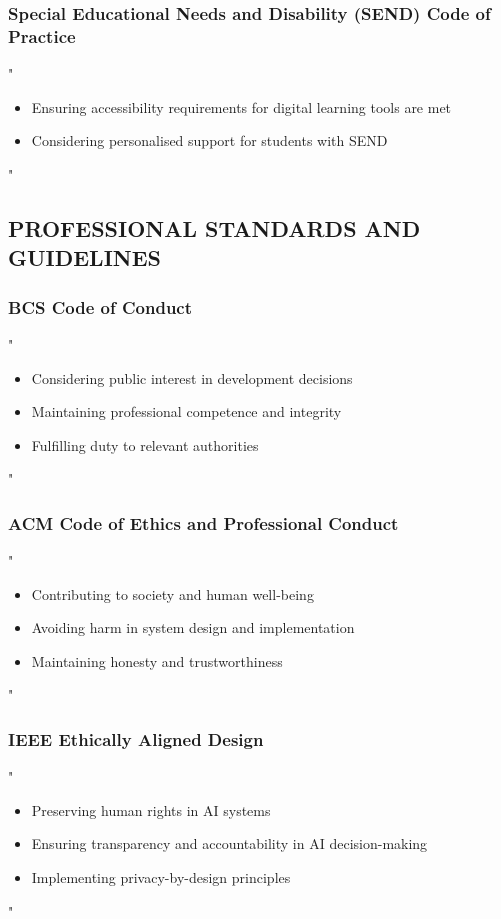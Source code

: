 \documentclass[14pt,a4paper]{article}
\begin{document}
\textit{\parencite{DfE2024a}}

\subsubsection*{Special Educational Needs and Disability (SEND) Code of Practice}
"
\begin{itemize}
    \item Ensuring accessibility requirements for digital learning tools are met
    \item Considering personalised support for students with SEND
\end{itemize}
"

\textit{\parencite{DfE2024b}}


\subsection*{PROFESSIONAL STANDARDS AND GUIDELINES}

\subsubsection*{BCS Code of Conduct}
"
\begin{itemize}
    \item Considering public interest in development decisions
    \item Maintaining professional competence and integrity
    \item Fulfilling duty to relevant authorities
\end{itemize}
"

\textit{\parencite[pp. 1-5]{BCS2024}}


\subsubsection*{ACM Code of Ethics and Professional Conduct}
"
\begin{itemize}
    \item Contributing to society and human well-being
    \item Avoiding harm in system design and implementation
    \item Maintaining honesty and trustworthiness
\end{itemize}
"

\textit{\parencite[pp. 1-4]{ACM2024}}

\subsubsection*{IEEE Ethically Aligned Design}
"
\begin{itemize}
    \item Preserving human rights in AI systems
    \item Ensuring transparency and accountability in AI decision-making
    \item Implementing privacy-by-design principles
\end{itemize}
"
\end{document}
